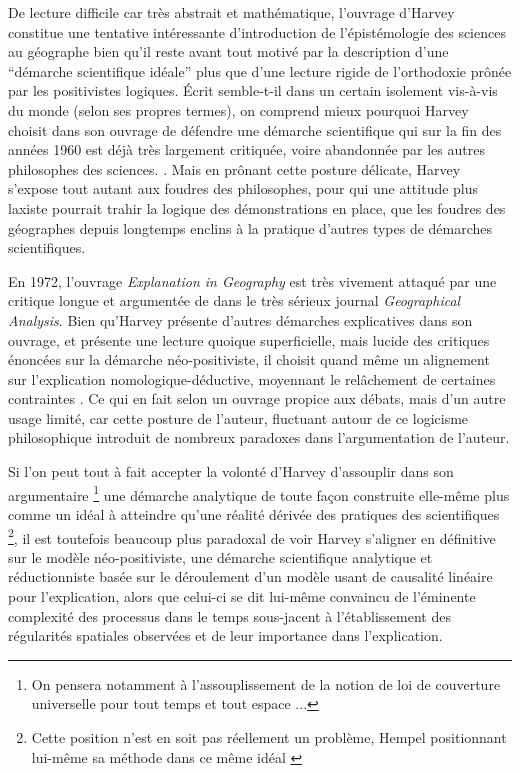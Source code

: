 De lecture difficile car très abstrait et mathématique, l'ouvrage d'Harvey constitue une tentative intéressante d'introduction de l'épistémologie des sciences au géographe bien qu'il reste avant tout motivé par la description d'une \enquote{démarche scientifique idéale} plus que d'une lecture rigide de l'orthodoxie prônée par les positivistes logiques. Écrit semble-t-il dans un certain isolement vis-à-vis du monde (selon ses propres termes), on comprend mieux pourquoi Harvey choisit dans son ouvrage de défendre une démarche scientifique qui sur la fin des années 1960 est déjà très largement critiquée, voire abandonnée par les autres philosophes des sciences. \autocite[147]{Ouelbani2006}. Mais en prônant cette posture délicate, Harvey s'expose tout autant aux foudres des philosophes, pour qui une attitude plus laxiste pourrait trahir la logique des démonstrations en place, que les foudres des géographes depuis longtemps enclins à la pratique d'autres types de démarches scientifiques.


En 1972, l'ouvrage \textit{Explanation in Geography} est très vivement attaqué par une critique longue et argumentée de \textcite{Gale1972} dans le très sérieux journal \textit{Geographical Analysis}. Bien qu'Harvey présente d'autres démarches explicatives dans son ouvrage, et présente une lecture quoique superficielle, mais lucide des critiques énoncées sur la démarche néo-positiviste, il choisit quand même un alignement sur l'explication nomologique-déductive, moyennant le relâchement de certaines contraintes \autocite[39-40]{Paterson1984}. Ce qui en fait selon \textcite{Gale1972} un ouvrage propice aux débats, mais d'un autre usage limité, car cette posture de l'auteur, fluctuant autour de ce logicisme philosophique introduit de nombreux paradoxes dans l'argumentation de l'auteur.

Si l'on peut tout à fait accepter la volonté d'Harvey d'assouplir dans son argumentaire \footnote{On pensera notamment à l'assouplissement de la notion de loi de couverture universelle pour tout temps et tout espace ... } une démarche analytique de toute façon construite elle-même plus comme un idéal à atteindre qu'une réalité dérivée des pratiques des scientifiques \footnote{Cette position n'est en soit pas réellement un problème, Hempel positionnant lui-même sa méthode dans ce même idéal \autocite{Besse2000}}, il est toutefois beaucoup plus paradoxal de voir Harvey s'aligner en définitive sur le modèle néo-positiviste, une démarche scientifique analytique et réductionniste \autocite[57-59]{Paterson1984} basée sur le déroulement d'un modèle usant de causalité linéaire pour l'explication, alors que celui-ci se dit lui-même convaincu de l'éminente complexité des processus dans le temps sous-jacent à l'établissement des régularités spatiales observées et de leur importance dans l'explication.

